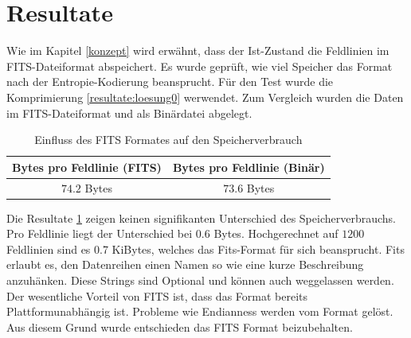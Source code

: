 \section{Resultate}\label{resultate}
Wie im Kapitel \ref{konzept} wird erwähnt, dass der Ist-Zustand die Feldlinien im FITS-Dateiformat abspeichert. Es wurde geprüft, wie viel Speicher das Format nach der Entropie-Kodierung beansprucht. Für den Test wurde die Komprimierung \ref{resultate:loesung0} werwendet. Zum Vergleich wurden die Daten im FITS-Dateiformat und als Binärdatei abgelegt.
\begin{table}[!htbp]
\center
\begin{tabular}{c|c}
	 Bytes pro Feldlinie (FITS) & Bytes pro Feldlinie (Binär)\\\hline
	$74.2$ Bytes & $73.6$ Bytes\\
\end{tabular}
\caption{Einfluss des FITS Formates auf den Speicherverbrauch}
\label{resultate:fits_table}
\end{table}
Die Resultate \ref{resultate:fits_table} zeigen keinen signifikanten Unterschied des Speicherverbrauchs. Pro Feldlinie liegt der Unterschied bei $0.6$ Bytes. Hochgerechnet auf $1200$ Feldlinien sind es 0.7 KiBytes, welches das Fits-Format für sich beansprucht. Fits erlaubt es, den Datenreihen einen Namen so wie eine kurze Beschreibung anzuhänken. Diese Strings sind Optional und können auch weggelassen werden.\\
Der wesentliche Vorteil von FITS ist, dass das Format bereits Plattformunabhängig ist. Probleme wie Endianness \cite{wiki:endianess} werden vom Format gelöst. Aus diesem Grund wurde entschieden das FITS Format beizubehalten.

